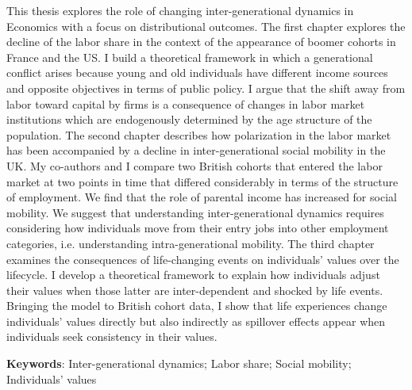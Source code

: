 This thesis explores the role of changing inter-generational dynamics in Economics with a focus on distributional outcomes. The first chapter explores the decline of the labor share in the context of the appearance of boomer cohorts in France and the US. I build a theoretical framework in which a generational conflict arises because young and old individuals have different income sources and opposite objectives in terms of public policy. I argue that the shift away from labor toward capital by firms is a consequence of changes in labor market institutions which are endogenously determined by the age structure of the population. The second chapter describes how polarization in the labor market has been accompanied by a decline in inter-generational social mobility in the UK. My co-authors and I compare two British cohorts that entered the labor market at two points in time that differed considerably in terms of the structure of employment. We find that the role of parental income has increased for social mobility. We suggest that understanding inter-generational dynamics requires considering how individuals move from their entry jobs into other employment categories, i.e. understanding intra-generational mobility. The third chapter examines the consequences of life-changing events on individuals’ values over the lifecycle. I develop a theoretical framework to explain how individuals adjust their values when those latter are inter-dependent and shocked by life events. Bringing the model to British cohort data, I show that life experiences change individuals’ values directly but also indirectly as spillover effects appear when individuals seek consistency in their values.

\vspace{0.5cm}
\noindent\textbf{Keywords}: Inter-generational dynamics; Labor share; Social mobility; Individuals' values\\
